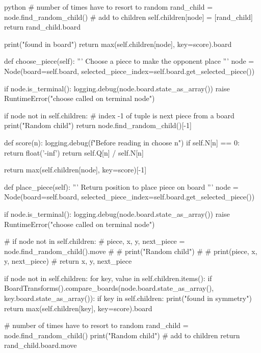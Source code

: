 \begin{mintedbox}{python}
            # number of times have to resort to random
            rand_child = node.find_random_child()
            # add to children
            self.children[node] = [rand_child]
            return rand_child.board

        print("found in board")
        return max(self.children[node], key=score).board

    def choose_piece(self):
        '''
        Choose a piece to make the opponent place
        '''
        node = Node(board=self.board,
                    selected_piece_index=self.board.get_selected_piece())

        if node.is_terminal():
            logging.debug(node.board.state_as_array())
            raise RuntimeError("choose called on terminal node")

        if node not in self.children:
            # index -1 of tuple is next piece from a board
            print("Random child")
            return node.find_random_child()[-1]

        def score(n):
            logging.debug(f"Before reading in choose {n}")
            if self.N[n] == 0:
                return float('-inf')
            return self.Q[n] / self.N[n]

        return max(self.children[node], key=score)[-1]

    def place_piece(self):
        '''
        Return position to place piece on board
        '''
        node = Node(board=self.board,
                    selected_piece_index=self.board.get_selected_piece())

        if node.is_terminal():
            logging.debug(node.board.state_as_array())
            raise RuntimeError("choose called on terminal node")

        # if node not in self.children:
        #     piece, x, y, next_piece = node.find_random_child().move
        #     # print("Random child")
        #     # print(piece, x, y, next_piece)
        #     return x, y, next_piece

        if node not in self.children:
            for key, value in self.children.items():
                if BoardTransforms().compare_boards(node.board.state_as_array(), key.board.state_as_array()):
                    if key in self.children:
                        print("found in symmetry")
                        return max(self.children[key], key=score).board

            # number of times have to resort to random
            rand_child = node.find_random_child()
            print("Random child")
            # add to children
            return rand_child.board.move


\end{mintedbox}

